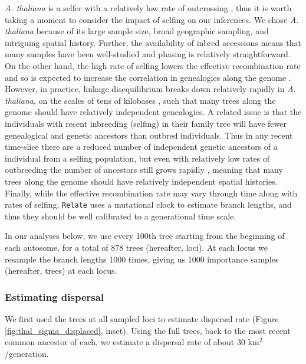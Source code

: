 \documentclass[12pt]{article}
\begin{document}
\textit{A. thaliana} is a selfer with a relatively low rate of outcrossing \citep{bomblies2010local,platt2010scale}, thus it is worth taking a moment to consider the impact of selfing on our inferences. We chose \textit{A. thaliana} because of its large sample size, broad geographic sampling, and intriguing spatial history. Further, the availability of inbred accessions means that many samples have been well-studied and phasing is relatively straightforward. On the other hand, the high rate of selfing lowers the effective recombination rate and so is expected to increase the correlation in genealogies along the genome \citep{nordborg2000linkage}. However, in practice, linkage disequilibrium breaks down relatively rapidly in \textit{A. thaliana}, on the scales of tens of kilobases \citep{kim2007recombination}, such that many trees along the genome should have relatively independent genealogies. A related issue is that the individuals with recent inbreeding (selfing) in their family tree will have fewer genealogical and genetic ancestors than outbred individuals. Thus in any recent time-slice there are a reduced number of independent genetic ancestors of a individual from a selfing population, but even with relatively low rates of outbreeding the number of ancestors still grows rapidly \citep{lachance2009inbreeding}, meaning that many trees along the genome should have relatively independent spatial histories. Finally, while the effective recombination rate may vary through time along with rates of selfing, \texttt{Relate} uses a mutational clock to estimate branch lengths, and thus they should be well calibrated to a generational time scale.

In our analyses below, we use every 100th tree starting from the beginning of each autosome, for a total of 878 trees (hereafter, loci). At each locus we resample the branch lengths 1000 times, giving us 1000 importance samples (hereafter, trees) at each locus.

\subsubsection*{Estimating dispersal}

We first used the trees at all sampled loci to estimate dispersal rate (Figure \ref{fig:thal_sigma_displaced}, inset). Using the full trees, back to the most recent common ancestor of each, we estimate a dispersal rate of about $30$ km$^2$/generation. 
\end{document}
